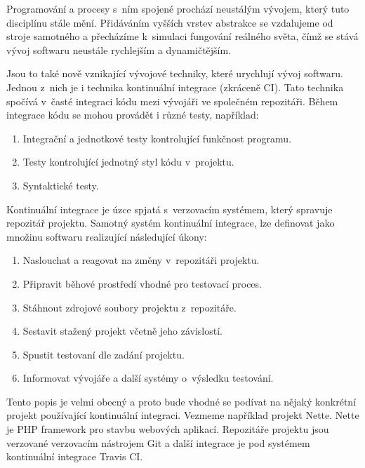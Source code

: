 \begin{introduction}

Programování a procesy s~ním spojené prochází neustálým vývojem, který tuto disciplínu stále mění. 
Přidáváním vyšších vrstev abstrakce se vzdalujeme od stroje samotného a přecházíme k~simulaci fungování reálného světa, čímž se stává vývoj softwaru neustále rychlejším a dynamičtějším. 

Jsou to také nově vznikající vývojové techniky, které urychlují vývoj softwaru.
Jednou z~nich je i technika kontinuální integrace (zkráceně CI).
Tato technika spočívá v~časté integraci kódu mezi vývojáři ve společném repozitáři.
Během integrace kódu se mohou provádět i různé testy, například:

\begin{enumerate}
	\item Integrační a jednotkové testy kontrolující funkčnost programu.
	\item Testy kontrolující jednotný styl kódu v~projektu.
	\item Syntaktické testy.
\end{enumerate}

Kontinuální integrace je úzce spjatá s~verzovacím systémem, který spravuje repozitář projektu.
Samotný systém kontinuální integrace, lze definovat jako množinu softwaru realizující následující úkony:

\begin{enumerate}
	\item Naslouchat a reagovat na změny v~repozitáři projektu.
	\item Připravit běhové prostředí vhodné pro testovací proces.
	\item Stáhnout zdrojové soubory projektu z~repozitáře.
	\item Sestavit stažený projekt včetně jeho závislostí.
	\item Spustit testovaní dle zadání projektu.
	\item Informovat vývojáře a další systémy o~výsledku testování.
\end{enumerate}

\end{introduction}

Tento popis je velmi obecný a proto bude vhodné se podívat na nějaký konkrétní projekt používající kontinuální integraci.
Vezmeme například projekt Nette.
Nette je PHP framework pro stavbu webových aplikací.
Repozitáře projektu jsou verzované verzovacím nástrojem Git a další integrace je pod systémem kontinuální integrace Travis CI.

